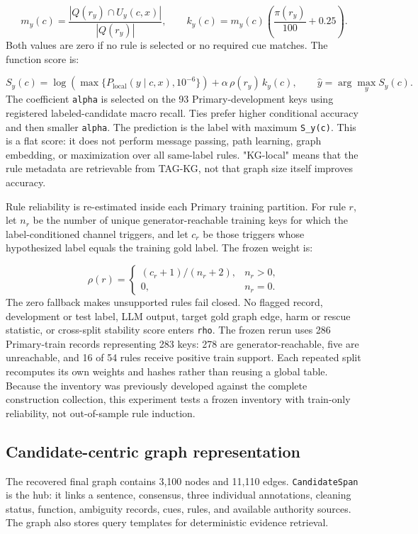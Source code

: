 \documentclass{CUP-JNL-NLP}
\begin{document}
\begin{equation}
m_y(c)=\frac{|Q(r_y)\cap U_y(c,x)|}{|Q(r_y)|},\qquad k_y(c)=m_y(c)\left(\frac{\pi(r_y)}{100}+0.25\right).
\end{equation}
Both values are zero if no rule is selected or no required cue matches. The function score is:

\begin{equation}
S_y(c)=\log\!\left(\max\{P_{\mathrm{local}}(y\mid c,x),10^{-6}\}\right)+\alpha\,\rho(r_y)\,k_y(c),\qquad \widehat y=\arg\max_y S_y(c).
\end{equation}
The coefficient \texttt{alpha} is selected on the 93 Primary-development keys using registered labeled-candidate macro recall. Ties prefer higher conditional accuracy and then smaller \texttt{alpha}. The prediction is the label with maximum \texttt{S\_y(c)}. This is a flat score: it does not perform message passing, path learning, graph embedding, or maximization over all same-label rules. "KG-local" means that the rule metadata are retrievable from TAG-KG, not that graph size itself improves accuracy.

Rule reliability is re-estimated inside each Primary training partition. For rule $r$, let $n_r$ be the number of unique generator-reachable training keys for which the label-conditioned channel triggers, and let $c_r$ be those triggers whose hypothesized label equals the training gold label. The frozen weight is:

\begin{equation}
\rho(r)=\begin{cases}(c_r+1)/(n_r+2),&n_r>0,\\0,&n_r=0.\end{cases}
\end{equation}
The zero fallback makes unsupported rules fail closed. No flagged record, development or test label, LLM output, target gold graph edge, harm or rescue statistic, or cross-split stability score enters \texttt{rho}. The frozen rerun uses 286 Primary-train records representing 283 keys: 278 are generator-reachable, five are unreachable, and 16 of 54 rules receive positive train support. Each repeated split recomputes its own weights and hashes rather than reusing a global table. Because the inventory was previously developed against the complete construction collection, this experiment tests a frozen inventory with train-only reliability, not out-of-sample rule induction.

\subsection{Candidate-centric graph representation}
The recovered final graph contains 3,100 nodes and 11,110 edges. \texttt{CandidateSpan} is the hub: it links a sentence, consensus, three individual annotations, cleaning status, function, ambiguity records, cues, rules, and available authority sources. The graph also stores query templates for deterministic evidence retrieval.
\end{document}
